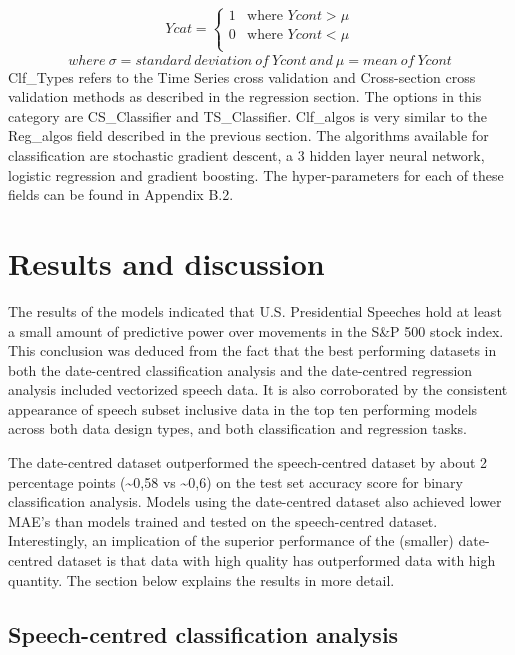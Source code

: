 \documentclass[11pt,preprint, authoryear]{elsarticle}
\numberwithin{equation}{section}
\numberwithin{figure}{section}
\numberwithin{table}{section}
\begin{document}
\begin{align}
Ycat=   \left\{ 
\begin{array}{ll} 
      1  &\text{where } Ycont>\mu \label{eq2} \\
      0  &\text{where } Ycont<\mu \\
\end{array} 
\right. 
\end{align} \[
where \ \sigma = standard \ deviation \ of \ Ycont \ and \ \mu = mean \ of \ Ycont
\] Clf\_Types refers to the Time Series cross validation and
Cross-section cross validation methods as described in the regression
section. The options in this category are CS\_Classifier and
TS\_Classifier. Clf\_algos is very similar to the Reg\_algos field
described in the previous section. The algorithms available for
classification are stochastic gradient descent, a 3 hidden layer neural
network, logistic regression and gradient boosting. The hyper-parameters
for each of these fields can be found in Appendix B.2.

\hypertarget{results-and-discussion}{%
\section{Results and discussion}\label{results-and-discussion}}

The results of the models indicated that U.S. Presidential Speeches hold
at least a small amount of predictive power over movements in the S\&P
500 stock index. This conclusion was deduced from the fact that the best
performing datasets in both the date-centred classification analysis and
the date-centred regression analysis included vectorized speech data. It
is also corroborated by the consistent appearance of speech subset
inclusive data in the top ten performing models across both data design
types, and both classification and regression tasks.

The date-centred dataset outperformed the speech-centred dataset by
about 2 percentage points (\textasciitilde0,58 vs \textasciitilde0,6) on
the test set accuracy score for binary classification analysis. Models
using the date-centred dataset also achieved lower MAE's than models
trained and tested on the speech-centred dataset. Interestingly, an
implication of the superior performance of the (smaller) date-centred
dataset is that data with high quality has outperformed data with high
quantity. The section below explains the results in more detail.

\hypertarget{speech-centred-classification-analysis}{%
\subsection{Speech-centred classification
analysis}\label{speech-centred-classification-analysis}}
\end{document}
